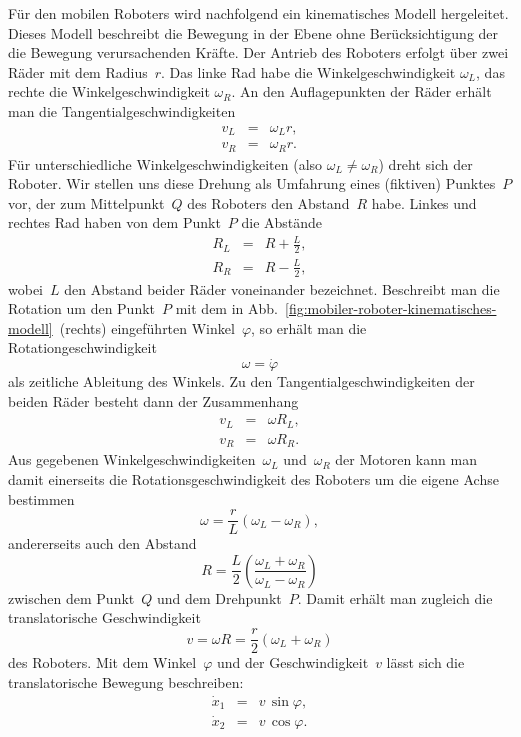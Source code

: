 Für den mobilen Roboters wird nachfolgend ein kinematisches Modell
hergeleitet. Dieses Modell beschreibt die Bewegung in der Ebene ohne
Berücksichtigung der die Bewegung verursachenden Kräfte. Der Antrieb
des Roboters erfolgt über zwei Räder mit dem Radius~$r$. Das linke
Rad habe die Winkelgeschwindigkeit $\omega_{L}$, das rechte die Winkelgeschwindigkeit
$\omega_{R}$. An den Auflagepunkten der Räder erhält man die Tangentialgeschwindigkeiten
\[
\begin{array}{lcl}
v_{L} & = & \omega_{L}r,\\
v_{R} & = & \omega_{R}r.
\end{array}
\]
Für unterschiedliche Winkelgeschwindigkeiten (also $\omega_{L}\neq\omega_{R}$)
dreht sich der Roboter. Wir stellen uns diese Drehung als Umfahrung
eines (fiktiven) Punktes~$P$ vor, der zum Mittelpunkt~$Q$ des
Roboters den Abstand~$R$ habe. Linkes und rechtes Rad haben von
dem Punkt~$P$ die Abstände
\[
\begin{array}{lcl}
R_{L} & = & R+\frac{L}{2},\\
R_{R} & = & R-\frac{L}{2},
\end{array}
\]
wobei~$L$ den Abstand beider Räder voneinander bezeichnet. Beschreibt
man die Rotation um den Punkt~$P$ mit dem in Abb.~\ref{fig:mobiler-roboter-kinematisches-modell}~(rechts)
eingeführten Winkel~$\varphi$, so erhält man die Rotationgeschwindigkeit
\begin{equation}
\omega=\dot{\varphi}\label{eq:roboter-modell-rot}
\end{equation}
als zeitliche Ableitung des Winkels. Zu den Tangentialgeschwindigkeiten
der beiden Räder besteht dann der Zusammenhang
\[
\begin{array}{lcl}
v_{L} & = & \omega R_{L},\\
v_{R} & = & \omega R_{R}.
\end{array}
\]
Aus gegebenen Winkelgeschwindigkeiten~$\omega_{L}$ und~$\omega_{R}$
der Motoren kann man damit einerseits die Rotationsgeschwindigkeit
des Roboters um die eigene Achse bestimmen
\[
\omega=\frac{r}{L}\left(\omega_{L}-\omega_{R}\right),
\]
andererseits auch den Abstand
\[
R=\frac{L}{2}\left(\frac{\omega_{L}+\omega_{R}}{\omega_{L}-\omega_{R}}\right)
\]
zwischen dem Punkt~$Q$ und dem Drehpunkt~$P$. Damit erhält man
zugleich die translatorische Geschwindigkeit 
\[
v=\omega R=\frac{r}{2}\left(\omega_{L}+\omega_{R}\right)
\]
des Roboters. Mit dem Winkel~$\varphi$ und der Geschwindigkeit~$v$
lässt sich die translatorische Bewegung beschreiben: 
\begin{equation}
\begin{array}{lcl}
\dot{x}_{1} & = & v\,\sin\varphi,\\
\dot{x}_{2} & = & v\,\cos\varphi.
\end{array}\label{eq:roboter-modell-trans}
\end{equation}
